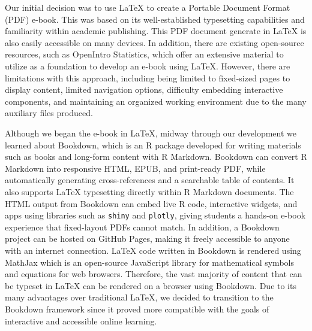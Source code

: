 \documentclass[11pt]{article}
\begin{document}
Our initial decision was to use LaTeX to create a Portable Document Format (PDF) e-book.
This was based on its well-established typesetting capabilities and familiarity within academic publishing.
This PDF document generate in LaTeX is also easily accessible on many devices.
In addition, there are existing open-source resources, such as OpenIntro Statistics, which offer an extensive material to utilize as a foundation to develop an e-book using LaTeX.
However, there are limitations with this approach, including being limited to fixed-sized pages to display content, limited navigation options, difficulty embedding interactive components, and maintaining an organized working environment due to the many auxiliary files produced.

Although we began the e-book in LaTeX, midway through our development we learned about Bookdown, which is an R package developed for writing materials such as books and long-form content with R Markdown. 
Bookdown can convert R Markdown into responsive HTML, EPUB, and print-ready PDF, while automatically generating cross-references and a searchable table of contents. It also supports LaTeX typesetting directly within R Markdown documents. The HTML output from Bookdown can embed live R code, interactive widgets, and apps using libraries such as \texttt{shiny} and \texttt{plotly}, giving students a hands-on e-book experience that fixed-layout PDFs cannot match. In addition, a Bookdown project can be hosted on GitHub Pages, making it freely accessible to anyone with an internet connection.
LaTeX code written in Bookdown is rendered using MathJax which is an open-source JavaScript library for mathematical symbols and equations for web browsers.
Therefore, the vast majority of content that can be typeset in LaTeX can be rendered on a browser using Bookdown.
Due to its many advantages over traditional LaTeX, we decided to transition to the Bookdown framework since it proved more compatible with the goals of interactive and accessible online learning. 
\end{document}
